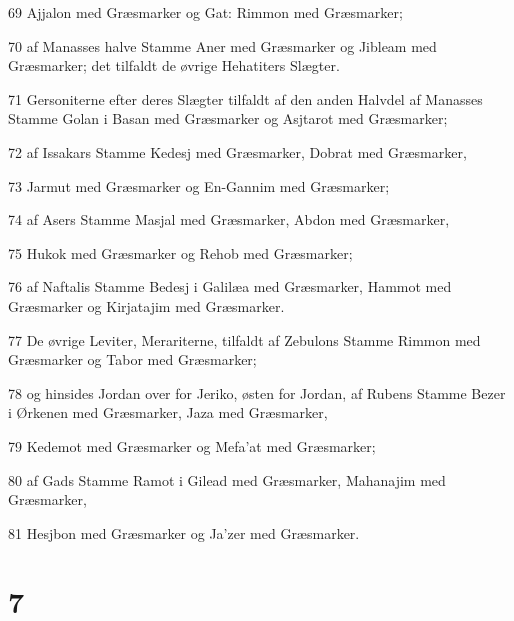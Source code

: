 \par 69 Ajjalon med Græsmarker og Gat: Rimmon med Græsmarker;
\par 70 af Manasses halve Stamme Aner med Græsmarker og Jibleam med Græsmarker; det tilfaldt de øvrige Hehatiters Slægter.
\par 71 Gersoniterne efter deres Slægter tilfaldt af den anden Halvdel af Manasses Stamme Golan i Basan med Græsmarker og Asjtarot med Græsmarker;
\par 72 af Issakars Stamme Kedesj med Græsmarker, Dobrat med Græsmarker,
\par 73 Jarmut med Græsmarker og En-Gannim med Græsmarker;
\par 74 af Asers Stamme Masjal med Græsmarker, Abdon med Græsmarker,
\par 75 Hukok med Græsmarker og Rehob med Græsmarker;
\par 76 af Naftalis Stamme Bedesj i Galilæa med Græsmarker, Hammot med Græsmarker og Kirjatajim med Græsmarker.
\par 77 De øvrige Leviter, Merariterne, tilfaldt af Zebulons Stamme Rimmon med Græsmarker og Tabor med Græsmarker;
\par 78 og hinsides Jordan over for Jeriko, østen for Jordan, af Rubens Stamme Bezer i Ørkenen med Græsmarker, Jaza med Græsmarker,
\par 79 Kedemot med Græsmarker og Mefa'at med Græsmarker;
\par 80 af Gads Stamme Ramot i Gilead med Græsmarker, Mahanajim med Græsmarker,
\par 81 Hesjbon med Græsmarker og Ja'zer med Græsmarker.

\chapter{7}

